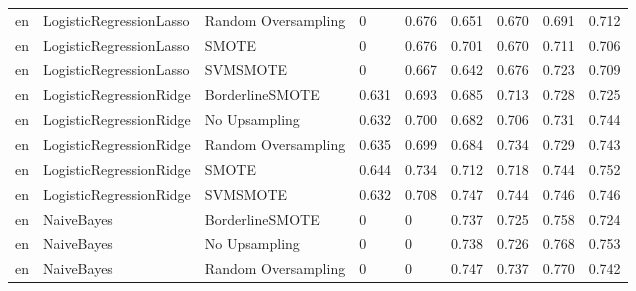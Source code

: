 \begin{tabular}{lllllllll}
      en &      LogisticRegressionLasso & Random Oversampling &     0 &                     0.676 &                 0.651 &                  0.670 &                                   0.691 &     0.712 \\
      en &      LogisticRegressionLasso &               SMOTE &     0 &                     0.676 &                 0.701 &                  0.670 &                                   0.711 &     0.706 \\
      en &      LogisticRegressionLasso &            SVMSMOTE &     0 &                     0.667 &                 0.642 &                  0.676 &                                   0.723 &     0.709 \\
      en &      LogisticRegressionRidge &     BorderlineSMOTE & 0.631 &                     0.693 &                 0.685 &                  0.713 &                                   0.728 &     0.725 \\
      en &      LogisticRegressionRidge &       No Upsampling & 0.632 &                     0.700 &                 0.682 &                  0.706 &                                   0.731 &     0.744 \\
      en &      LogisticRegressionRidge & Random Oversampling & 0.635 &                     0.699 &                 0.684 &                  0.734 &                                   0.729 &     0.743 \\
      en &      LogisticRegressionRidge &               SMOTE & 0.644 &                     0.734 &                 0.712 &                  0.718 &                                   0.744 &     0.752 \\
      en &      LogisticRegressionRidge &            SVMSMOTE & 0.632 &                     0.708 &                 0.747 &                  0.744 &                                   0.746 &     0.746 \\
      en &                   NaiveBayes &     BorderlineSMOTE &     0 &                         0 &                 0.737 &                  0.725 &                                   0.758 &     0.724 \\
      en &                   NaiveBayes &       No Upsampling &     0 &                         0 &                 0.738 &                  0.726 &                                   0.768 &     0.753 \\
      en &                   NaiveBayes & Random Oversampling &     0 &                         0 &                 0.747 &                  0.737 &                                   0.770 &     0.742 \\

\end{tabular}
